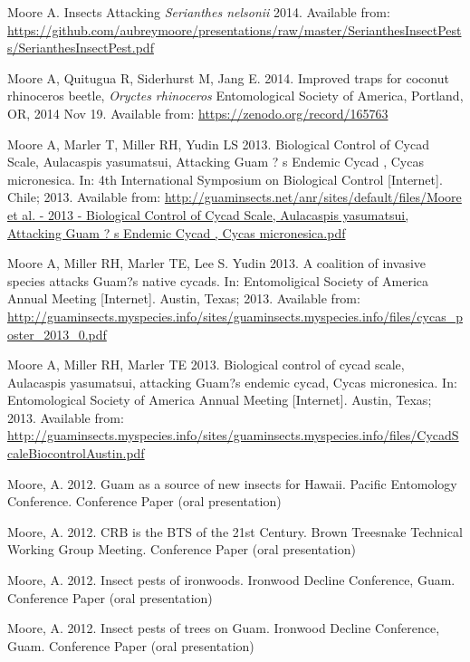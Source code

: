\documentclass[12pt,english]{simplecv}
\begin{document}
\begin{thebibliography}{999}
\bibitem{}Moore A. Insects Attacking \emph{Serianthes nelsonii} 2014. Available from: \url{https://github.com/aubreymoore/presentations/raw/master/SerianthesInsectPests/SerianthesInsectPest.pdf}

\bibitem{}Moore A, Quitugua R, Siderhurst M, Jang E. 2014. Improved traps for coconut rhinoceros beetle, \emph{Oryctes rhinoceros} Entomological Society of America, Portland, OR, 2014 Nov 19. Available from: \url{https://zenodo.org/record/165763}


\bibitem{}Moore A, Marler T, Miller RH, Yudin LS 2013. Biological Control of Cycad Scale, Aulacaspis yasumatsui, Attacking Guam ? s Endemic Cycad , Cycas micronesica. In: 4th International Symposium on Biological Control [Internet]. Chile; 2013. Available from: \url{http://guaminsects.net/anr/sites/default/files/Moore et al. - 2013 - Biological Control of Cycad Scale, Aulacaspis yasumatsui, Attacking Guam ? s Endemic Cycad , Cycas micronesica.pdf}

\bibitem{}Moore A, Miller RH, Marler TE, Lee S. Yudin 2013. A coalition of invasive species attacks Guam?s native cycads. In: Entomoligical Society of America Annual Meeting [Internet]. Austin, Texas; 2013. Available from: \url{http://guaminsects.myspecies.info/sites/guaminsects.myspecies.info/files/cycas_poster_2013_0.pdf}

\bibitem{}Moore A, Miller RH, Marler TE 2013. Biological control of cycad scale, Aulacaspis yasumatsui, attacking Guam?s endemic cycad, Cycas micronesica. In: Entomological Society of America Annual Meeting [Internet]. Austin, Texas; 2013. Available from: \url{http://guaminsects.myspecies.info/sites/guaminsects.myspecies.info/files/CycadScaleBiocontrolAustin.pdf}


Moore, A. 2012. Guam as a source of new insects for
Hawaii. Pacific Entomology Conference. Conference Paper (oral presentation)

Moore, A. 2012. CRB is the BTS of the 21st Century.
Brown Treesnake Technical Working Group Meeting. Conference Paper
(oral presentation)

Moore, A. 2012. Insect pests of ironwoods. Ironwood
Decline Conference, Guam. Conference Paper (oral presentation)

Moore, A. 2012. Insect pests of trees on Guam. Ironwood
Decline Conference, Guam. Conference Paper (oral presentation)


\end{thebibliography}
\end{document}
